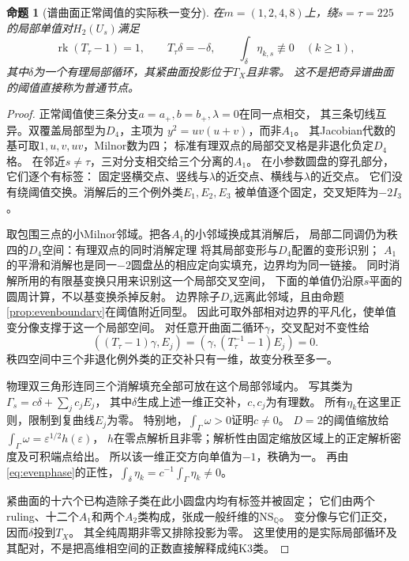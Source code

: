 \documentclass[11pt,a4paper]{ctexart}
\theoremstyle{cnplain}\newtheorem{theorem}{定理}[section]
\newtheorem{proposition}[theorem]{命题}
\theoremstyle{definition}\newtheorem{definition}[theorem]{定义}
\theoremstyle{remark}\newtheorem{remark}[theorem]{注}
\newcommand{\rk}{\operatorname{rk}}\newcommand{\im}{\operatorname{im}}
\begin{document}
\begin{proposition}[谱曲面正常阈值的实际秩一变分]\label{prop:evenlocal}
在$m=(1,2,4,8)$上，绕$s=\tau=225$的局部单值对$H_2(U_s)$满足
\[
 \rk(T_\tau-1)=1,\qquad T_\tau\delta=-\delta,
 \qquad \int_\delta\eta_{k,s}\not\equiv0\quad(k\ge1),
\]
其中$\delta$为一个有理局部循环，其紧曲面投影位于$T_X$且非零。
这不是把奇异谱曲面的阈值直接称为普通节点。
\end{proposition}
\begin{proof}
正常阈值使三条分支$a=a_+,b=b_+,\lambda=0$在同一点相交，
其三条切线互异。双覆盖局部型为$D_4$，主项为
$y^2=uv(u+v)$，而非$A_1$。
其Jacobian代数的基可取$1,u,v,uv$，Milnor数为四；
标准有理双点的局部交叉格是非退化负定$D_4$格\cite{HuyK3,WahlD4}。
在邻近$s\ne\tau$，三对分支相交给三个分离的$A_1$。
在小参数圆盘的穿孔部分，它们逐个有标签：
固定竖横交点、竖线与$\lambda$的近交点、横线与$\lambda$的近交点。
它们没有绕阈值交换。消解后的三个例外类$E_1,E_2,E_3$
被单值逐个固定，交叉矩阵为$-2I_3$。

取包围三点的小Milnor邻域。把各$A_1$的小邻域换成其消解后，
局部二同调仍为秩四的$D_4$空间：有理双点的同时消解定理
将其局部变形与$D_4$配置的变形识别\cite{WahlD4}；
$A_1$的平滑和消解也是同一$-2$圆盘丛的相应定向实填充，边界均为同一链接。
同时消解所用的有限基变换只用来识别这一个局部交叉空间，
下面的单值仍沿原$s$平面的圆周计算，不以基变换杀掉反射。
边界除子$D_s$远离此邻域，且由命题\ref{prop:evenboundary}在阈值附近同型。
因此可取外部相对边界的平凡化，使单值变分像支撑于这一个局部空间。
对任意开曲面二循环$\gamma$，交叉配对不变性给
\[
 ((T_\tau-1)\gamma,E_j)
          =(\gamma,(T_\tau^{-1}-1)E_j)=0.
\]
秩四空间中三个非退化例外类的正交补只有一维，故变分秩至多一。

物理双三角形连同三个消解填充全部可放在这个局部邻域内。
写其类为$\Gamma_s=c\delta+\sum_j c_jE_j$，
其中$\delta$生成上述一维正交补，$c,c_j$为有理数。
所有$\eta_k$在这里正则，限制到复曲线$E_j$为零。
特别地，$\int_\Gamma\omega>0$证明$c\ne0$。
$D=2$的阈值缩放给$\int_\Gamma\omega=\varepsilon^{1/2}h(\varepsilon)$，
$h$在零点解析且非零；解析性由固定缩放区域上的正定解析密度及可积端点给出。
所以该一维正交方向单值为$-1$，秩确为一。
再由\eqref{eq:evenphase}的正性，$\int_\delta\eta_k=c^{-1}\int_\Gamma\eta_k\ne0$。

紧曲面的十六个已构造除子类在此小圆盘内均有标签并被固定；
它们由两个ruling、十二个$A_1$和两个$A_2$类构成，张成一般纤维的$\mathrm{NS}_\mathbb Q$。
变分像与它们正交，因而$\delta$投到$T_X$。
其全纯周期非零又排除投影为零。
这里使用的是实际局部循环及其配对，不是把高维相空间的正数直接解释成纯K3类。
\end{proof}
\end{document}
